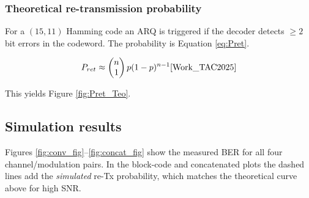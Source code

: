 \begin{comment}
\begin{figure}[h]
\centering
\begin{tikzpicture}[node distance=6mm,>=latex,font=\small]
  \node[draw,rectangle] (src) {ASCII / Huffman};
  \node[draw,rectangle,right=of src] (fec)  {FEC \\ (Conv, Ham, Both)};
  \node[draw,rectangle,right=of fec] (int)  {Interleaver};
  \node[draw,rectangle,right=of int] (map)  {QPSK / 16-QAM \\ + OFDM};
  \node[draw,rectangle,right=of map] (chan) {AWGN / Rayleigh};
  \node[draw,rectangle,right=of chan] (dmap){Demap \\+ FFT};
  \node[draw,rectangle,right=of dmap] (dint){De-interleaver};
  \node[draw,rectangle,right=of dint] (dfec){FEC Decoder};
  \node[draw,rectangle,right=of dfec] (sink){ASCII / Huffman Decode};
  \draw[->] (src)--(fec)--(int)--(map)--(chan)--(dmap)--(dint)--(dfec)--(sink);
\end{tikzpicture}
\caption{End-to-end block diagram used in Phase II.}
\label{fig:sys_block_diag}
\end{figure}

\end{comment}
\subsubsection{Theoretical re-transmission probability}

For a $(15,11)$ Hamming code an ARQ is triggered if the decoder
detects \(\ge 2\) bit errors in the codeword. The probability is Equation \ref{eq:Pret}.

\begin{equation}
      P_{ret} \approx \begin{pmatrix}n \\ 1\end{pmatrix}p(1-p)^{n-1} \text{\cite{Work_TAC2025}}
      \label{eq:Pret}
\end{equation}

This yields Figure \ref{fig:Pret_Teo}.

\subsection{Simulation results}

Figures \ref{fig:conv_fig}–\ref{fig:concat_fig} show the measured BER
for all four channel/modulation pairs.  In the block-code and
concatenated plots the dashed lines add the \emph{simulated} re-Tx
probability, which matches the theoretical curve above for
high SNR.

